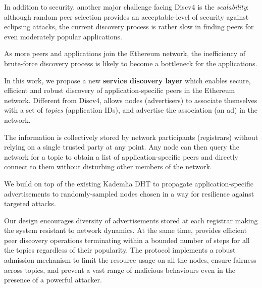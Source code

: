 In addition to security, another major challenge facing Discv4 is the \textit{scalability}: although random peer selection provides an acceptable-level of security against eclipsing attacks, the current discovery process is rather slow in finding peers for even moderately popular applications.  

As more peers and applications join the Ethereum network, the inefficiency of brute-force discovery process is likely to become a bottleneck for the applications.

 In this work, we propose a new \textbf{service discovery layer} which enables secure,  efficient and robust discovery of application-specific peers in the Ethereum network.
Different from Discv4, \sysname allows nodes (\ie advertisers) to associate themselves with a set of \emph{topics} (\eg application IDs), and advertise the association (\ie an ad) in the network. 

The information is collectively stored by network participants (\ie registrars) without relying on a single trusted party at any point. Any node can then query the network for a topic to obtain a list of application-specific peers and directly connect to them without disturbing other members of the network. 

We build \sysname on top of the existing Kademlia DHT to propagate application-specific advertisements to randomly-sampled nodes chosen in a way for resilience against targeted attacks. 

Our design encourages diversity of advertisements stored at each registrar making the system resistant to network dynamics. At the same time, \sysname provides efficient peer discovery operations terminating within a bounded number of steps  for all the topics regardless of their popularity. The protocol implements a robust admission mechanism to limit the resource usage on all the nodes, ensure fairness across topics, and prevent a vast range of malicious behaviours even in the presence of a powerful attacker.

